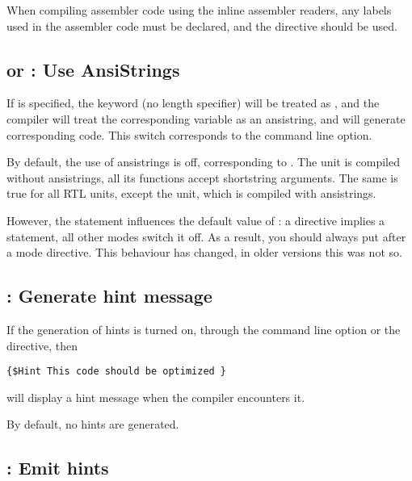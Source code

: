 \begin{remark}When compiling assembler code using the inline assembler
readers, any labels used in the assembler code must be declared, and 
the  directive should be used.
\end{remark}

\subsection{ or  : Use AnsiStrings}

If  is specified, the keyword  (no
length specifier) will be treated as , and the compiler
will treat the corresponding variable as an ansistring, and will
generate corresponding code. This switch corresponds to the 
command line option.

By default, the use of ansistrings is off, corresponding to .
The  unit is compiled without ansistrings, all its functions accept
shortstring arguments. The same is true for all RTL units, except the
 unit, which is compiled with ansistrings.

However, the  statement influences the default value of
: a  directive implies a
 statement, all other modes switch it off. As a result,
you should always put  after a mode directive. 
This behaviour has changed, in older \fpc versions this was not so. 

\subsection{ : Generate hint message}

If the generation of hints is turned on, through the  command line
option or the  directive, then
\begin{verbatim}
{$Hint This code should be optimized }
\end{verbatim}
will display a hint message when the compiler encounters it.

By default, no hints are generated.

\subsection{ : Emit hints}

